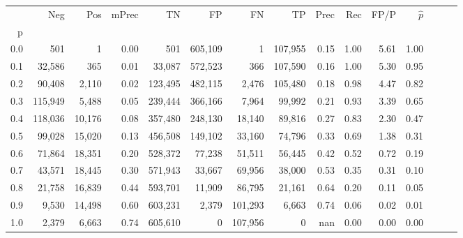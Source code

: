 \begin{tabular}{rrrrrrrrrrrrrrr}
\toprule
{} &      Neg &     Pos & mPrec &       TN &       FP &       FN &       TP &  Prec &   Rec &  FP/P & $\hat{p}$ \\
p   &          &         &       &          &          &          &          &       &       &       &           \\
\midrule
0.0 &      501 &       1 &  0.00 &      501 &  605,109 &        1 &  107,955 &  0.15 &  1.00 &  5.61 &      1.00 \\
0.1 &   32,586 &     365 &  0.01 &   33,087 &  572,523 &      366 &  107,590 &  0.16 &  1.00 &  5.30 &      0.95 \\
0.2 &   90,408 &   2,110 &  0.02 &  123,495 &  482,115 &    2,476 &  105,480 &  0.18 &  0.98 &  4.47 &      0.82 \\
0.3 &  115,949 &   5,488 &  0.05 &  239,444 &  366,166 &    7,964 &   99,992 &  0.21 &  0.93 &  3.39 &      0.65 \\
0.4 &  118,036 &  10,176 &  0.08 &  357,480 &  248,130 &   18,140 &   89,816 &  0.27 &  0.83 &  2.30 &      0.47 \\
0.5 &   99,028 &  15,020 &  0.13 &  456,508 &  149,102 &   33,160 &   74,796 &  0.33 &  0.69 &  1.38 &      0.31 \\
0.6 &   71,864 &  18,351 &  0.20 &  528,372 &   77,238 &   51,511 &   56,445 &  0.42 &  0.52 &  0.72 &      0.19 \\
0.7 &   43,571 &  18,445 &  0.30 &  571,943 &   33,667 &   69,956 &   38,000 &  0.53 &  0.35 &  0.31 &      0.10 \\
0.8 &   21,758 &  16,839 &  0.44 &  593,701 &   11,909 &   86,795 &   21,161 &  0.64 &  0.20 &  0.11 &      0.05 \\
0.9 &    9,530 &  14,498 &  0.60 &  603,231 &    2,379 &  101,293 &    6,663 &  0.74 &  0.06 &  0.02 &      0.01 \\
1.0 &    2,379 &   6,663 &  0.74 &  605,610 &        0 &  107,956 &        0 &   nan &  0.00 &  0.00 &      0.00 \\
\bottomrule
\end{tabular}
